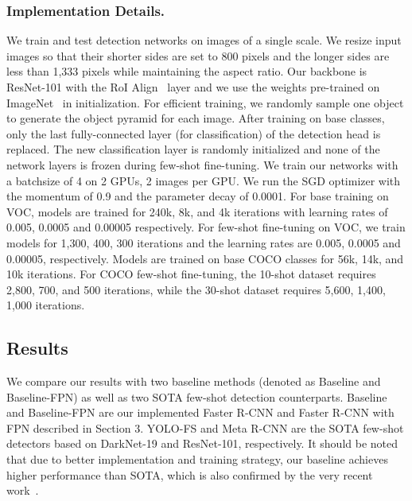 \documentclass[runningheads]{llncs}
\begin{document}
\subsubsection{Implementation Details.}
We train and test detection networks on images of a single scale. 
We resize input images so that their shorter sides are set to $800$ pixels and the longer sides are less than 1,333 pixels while maintaining the aspect ratio. 
Our backbone is ResNet-101 \cite{resnet} with the RoI Align~\cite{maskrcnn} layer and we use the weights pre-trained on ImageNet~\cite{imagenet} in initialization.
For efficient training, we randomly sample one object to generate the object pyramid for each image. 
After training on base classes, only the last fully-connected layer (for classification) of the detection head is replaced. 
The new classification layer is randomly initialized and none of the network layers is frozen during few-shot fine-tuning. 
We train our networks with a batchsize of 4 on 2 GPUs, 2 images per GPU. We run the SGD optimizer with the momentum of 0.9 and the parameter decay of 0.0001. 
For base training on VOC, models are trained for 240k, 8k, and 4k iterations with learning rates of 0.005, 0.0005 and 0.00005 respectively. 
For few-shot fine-tuning on VOC, we train models for 1,300, 400, 300 iterations and the learning rates are 0.005, 0.0005 and 0.00005, respectively. 
Models are trained on base COCO classes for 56k, 14k, and 10k iterations.
For COCO few-shot fine-tuning, the 10-shot dataset requires 2,800, 700, and 500 iterations, while the 30-shot dataset requires 5,600, 1,400, 1,000 iterations.

\subsection{Results}

We compare our results with two baseline methods (denoted as Baseline and Baseline-FPN) as well as two SOTA few-shot detection counterparts. 
Baseline and Baseline-FPN are our implemented Faster R-CNN and Faster R-CNN with FPN described in Section 3.
YOLO-FS \cite{yolore} and Meta R-CNN \cite{metarcnn} are the SOTA few-shot detectors based on DarkNet-19 and ResNet-101, respectively.
It should be noted that due to better implementation and training strategy, our baseline achieves higher performance than SOTA, which is also confirmed by the very recent work~\cite{ftfsod}.
\end{document}
